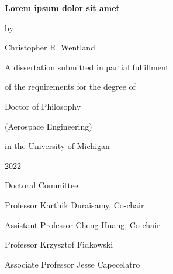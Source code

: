 \thispagestyle{empty}

\begin{singlespace}
\begin{center}

	\textbf{Lorem ipsum dolor sit amet}
	
	\vspace{2em}
	
	by
	
	\vspace{2em}
	
    Christopher R. Wentland
	
	\vspace{6em}
	
	A dissertation submitted in partial fulfillment
	
	of the requirements for the degree of
	
	Doctor of Philosophy
	
	(Aerospace Engineering)
	
	in the University of Michigan
	
	2022

\end{center}

\vspace{8em}

Doctoral Committee:

\vspace{1em}

\hspace{3em}Professor Karthik Duraisamy, Co-chair

\hspace{3em}Assistant Professor Cheng Huang, Co-chair

\hspace{3em}Professor Krzysztof Fidkowski

\hspace{3em}Associate Professor Jesse Capecelatro

\end{singlespace}
\restoregeometry